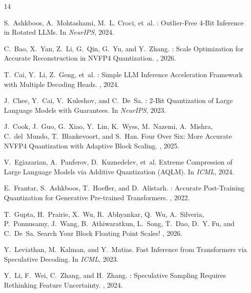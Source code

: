 \documentclass[11pt]{article}
\begin{document}
\begin{thebibliography}{14}

S.~Ashkboos, A.~Mohtashami, M.~L. Croci, et~al.
: Outlier-Free 4-Bit Inference in Rotated {LLM}s.
\newblock In {\em NeurIPS}, 2024.

C.~Bao, X.~Yan, Z.~Li, G.~Qin, G.~Yu, and Y.~Zhang.
: Scale Optimization for Accurate Reconstruction in {NVFP4}
  Quantization.
, 2026.

T.~Cai, Y.~Li, Z.~Geng, et~al.
: Simple {LLM} Inference Acceleration Framework with Multiple
  Decoding Heads.
, 2024.

J.~Chee, Y.~Cai, V.~Kuleshov, and C.~De~Sa.
: 2-Bit Quantization of Large Language Models with Guarantees.
\newblock In {\em NeurIPS}, 2023.

J.~Cook, J.~Guo, G.~Xiao, Y.~Lin, K.~Wyss, M.~Nazemi, A.~Mishra, C.~del~Mundo,
  T.~Blankevoort, and S.~Han.
\newblock Four Over Six: More Accurate {NVFP4} Quantization with Adaptive Block
  Scaling.
, 2025.

V.~Egiazarian, A.~Panferov, D.~Kuznedelev, et~al.
\newblock Extreme Compression of Large Language Models via Additive
  Quantization ({AQLM}).
\newblock In {\em ICML}, 2024.

E.~Frantar, S.~Ashkboos, T.~Hoefler, and D.~Alistarh.
: Accurate Post-Training Quantization for Generative
  Pre-trained Transformers.
, 2022.

T.~Gupta, H.~Prairie, X.~Wu, R.~Abhyankar, Q.~Wu, A.~Silveria, P.~Ponnusamy,
  J.~Wang, B.~Athiwaratkun, L.~Song, T.~Dao, D.~Y. Fu, and C.~De~Sa.
\newblock Search Your Block Floating Point Scales!
, 2026.

Y.~Leviathan, M.~Kalman, and Y.~Matias.
\newblock Fast Inference from Transformers via Speculative Decoding.
\newblock In {\em ICML}, 2023.

Y.~Li, F.~Wei, C.~Zhang, and H.~Zhang.
: Speculative Sampling Requires Rethinking Feature
  Uncertainty.
, 2024.


\end{thebibliography}
\end{document}
